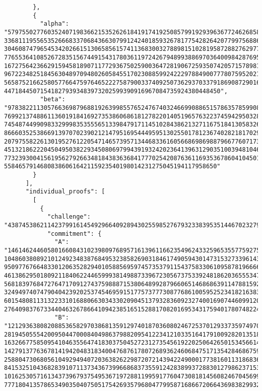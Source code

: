 \begin{lstlisting}
        },
        {
          "alpha": "5797550277603524071983662153526261841917419250857991929396367724626858728678 33681119556535266683370684366307991242401859326781775428264207799756886303774867 30460874796545342026615130658561574113683003278898151028195872882762977179409973 77655364108526728351567449154317803611972426794899388697036400984287695485551802 16727564236629159458189071177293675025900364728190672593507420571578981833871456 96722348251845630489709480260584551702308859924222978849007778075952021144041964 56587521662580577664759764652227587900337409250736293703379186908729016891971420 447184450715418279393483973202599390916967084735924380448450",
          "beta": "97838221130576636987968819263998557652476740324669908865157863578599087836308 76992137488611360191841692735386068618127822014051965763223745942950328427351051 74548744990983329998353555651339847917114510284386213271167518413058326819653814 86660352538669139707023902121479516954449595130255017812367402821817029223068444 20797558226130195276122054714657395713446833616056686986988796677607173043046648 45132186222045049503822934508069799439193242023641396312903510039481046387072470 77323930041561956279266348184383636841777025420876361169353678604104501070441474 55846579146808386061642115923540198014231275045194117958650"
        }
      ],
      "individual_proofs": [
        [
          {
            "challenge": "43874538621142379916145492966409289430255985276793233839535144670232793929873",
            "commitment": {
              "A": "1461462446058016608431023980976895716139611662354962433259653557759275267971   104860380892101249234838768495323858269031846174905943014731532733961438503302   950977676648330120635282940105885695974573537911543758330610958781966664849734   461386295018092118406224465999381498873396723056737533924818620365553476988351   568183976847276471709127437598887153806489928796606514686863911478815923475895   324949740747904042392025374546959151775737773087768610059525234182163831024857   601548081131322331016880663034330209045137932836092327400169074460991201142954   2764098376733440463267866410942385165152881708201695343175940178074822401",
              "B": "1212936380820885365829703868135912974018703608024672537012933735974970995643   281945055542009504470008404986379882095412234121033516417910092820135184188402   163266775850954104635564741830375045272312735456192202506426501534566141592451   142791377636781419420483183400476876178072689362460684751713542846867598155078   258804730680561049294940720363826229872072143942249000177381601131868366391469   841532510436828391071137343673996686837355912428389937288301279862371539224693   101625305716134373967937549536719728811995917760473081814560824670456995660608   777180413578653490350407505175426935796804779958716866720664369838299325"

\end{lstlisting}
